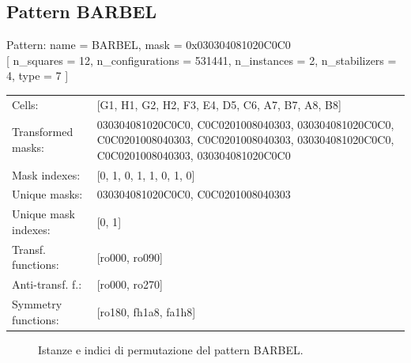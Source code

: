 \newpage

\subsection{Pattern BARBEL}

\begin{tcolorbox}[sharp corners, fontupper=\ttfamily\small, colback=white]
  \noindent Pattern: name = BARBEL, mask = 0x030304081020C0C0\\
  {[} n\_squares = 12, n\_configurations = 531441,
  n\_instances = 2, n\_stabilizers = 4, type = 7 { ]}\\[1.0ex]
  \begin{tabularx}{\textwidth}{@{} p{3.5cm} X @{}}
    Cells:               & {[}G1, H1, G2, H2, F3, E4, D5, C6, A7, B7, A8, B8{]}\\[0.5ex]
    Transformed masks:   & 030304081020C0C0, C0C0201008040303, 030304081020C0C0, C0C0201008040303, C0C0201008040303, 030304081020C0C0, C0C0201008040303, 030304081020C0C0\\[0.5ex]
    Mask indexes:        & {[}0, 1, 0, 1, 1, 0, 1, 0{]}\\[0.5ex]
    Unique masks:        & 030304081020C0C0, C0C0201008040303\\[0.5ex]
    Unique mask indexes: & {[}0, 1{]}\\[0.5ex]
    Transf. functions:   & {[}ro000, ro090{]}\\[0.5ex]
    Anti-transf. f.:     & {[}ro000, ro270{]}\\[0.5ex]
    Symmetry functions:  & {[}ro180, fh1a8, fa1h8{]}\\[0.5ex]
  \end{tabularx}
\end{tcolorbox}

\begin{figure}[htbp]
  \centering
   \hfill
   \hfill
   \hfill
  \vspace{0.3cm}
   \hfill
   \hfill
   \hfill
  \caption{Istanze e indici di permutazione del pattern BARBEL.}
\end{figure}

